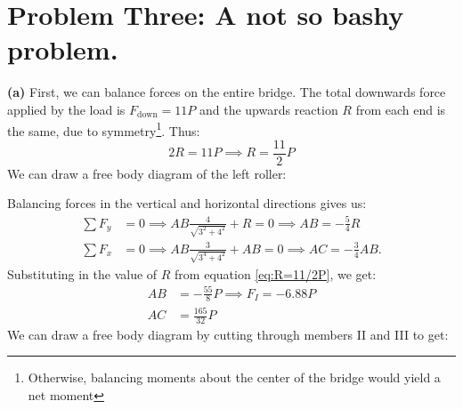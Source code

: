 \documentclass{article}
\begin{document}
\section{Problem Three: A not so bashy problem.}
\textbf{(a)} First, we can balance forces on the entire bridge. The total downwards force applied by the load is $F_\text{down}=11P$ and the upwards reaction $R$ from each end is the same, due to symmetry\footnote{Otherwise, balancing moments about the center of the bridge would yield a net moment}. Thus:
\begin{equation}
    2R=11P \implies R = \frac{11}{2}P
    \label{eq:R=11/2P}
\end{equation}
We can draw a free body diagram of the left roller:
\begin{center}
\end{center}
Balancing forces in the vertical and horizontal directions gives us:
\begin{align}
    \sum F_y &= 0 \implies AB\frac{4}{\sqrt{3^2+4^2}} + R = 0 \implies AB = -\frac{5}{4}R \\
    \sum F_x &= 0 \implies AB\frac{3}{\sqrt{3^4+4^2}} + AB = 0 \implies AC =  - \frac{3}{4}AB.
    \label{eq:}
\end{align}
Substituting in the value of $R$ from equation \ref{eq:R=11/2P}, we get:
\begin{align}
    AB &= -\frac{55}{8}P \implies \boxed{F_{I} = -6.88P} \\
    AC &= \frac{165}{32}P
\end{align}
We can draw a free body diagram by cutting through members II and III to get:
\end{document}
